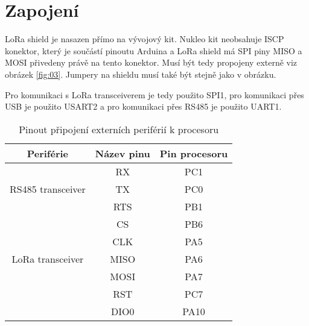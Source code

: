 \newpage
\section{Zapojení}
LoRa shield \cite{draginoWiki} je nasazen přímo na vývojový kit. 
Nukleo kit neobsahuje ISCP konektor, který je součástí pinoutu Arduina a LoRa shield má SPI piny MISO a MOSI přivedeny právě na tento konektor. Musí být tedy propojeny externě viz obrázek \ref{fig:03}.
Jumpery na shieldu musí také být stejně jako v obrázku.



Pro komunikaci s LoRa transceiverem je tedy použito SPI1, pro komunikaci přes USB je použito USART2 a pro komunikaci přes RS485 je použito UART1.


\begin{table}[h]
    \centering
    \begin{tabular}{ |c|c|c| }
     \hline

     Periférie          & Název pinu & Pin procesoru           \\ \hline \hline
     
                        & RX  &   PC1            \\
    RS485 transceiver   & TX  &   PC0       \\
                        & RTS  &  PB1      \\     \hline

                        & CS    &  PB6             \\
                        & CLK   &  PA5        \\
   LoRa transceiver     & MISO  &  PA6     \\
                        & MOSI  &  PA7        \\
                        & RST   & PC7          \\
                        & DIO0  & PA10         \\
                        \hline

    \end{tabular}
    \caption{Pinout připojení externích periférií k procesoru}
    \label{table:3}
\end{table}


